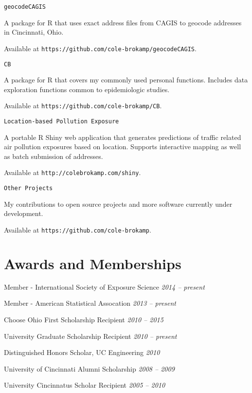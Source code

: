 \documentclass[margin,line]{res}
\newenvironment{list1}{
  \begin{list}{\ding{113}}{%
      \setlength{\itemsep}{0in}
      \setlength{\parsep}{0in} \setlength{\parskip}{0in}
      \setlength{\topsep}{0in} \setlength{\partopsep}{0in} 
      \setlength{\leftmargin}{0.17in}}}{\end{list}}
\newenvironment{list3}{
  \begin{list}{}{%
      \setlength{\itemsep}{0in}
      \setlength{\parsep}{0in} \setlength{\parskip}{0in}
      \setlength{\topsep}{0in} \setlength{\partopsep}{0in} 
      \setlength{\leftmargin}{0in}}}{\end{list}}
\begin{document}
\begin{resume}
\texttt{geocodeCAGIS}
\begin{list1} \itemsep 2pt
\item[] A package for R that uses exact address files from CAGIS to geocode addresses in Cincinnati, Ohio.
\item[] Available at \texttt{https://github.com/cole-brokamp/geocodeCAGIS}.
\end{list1}

\texttt{CB}
\begin{list1} \itemsep 2pt
\item[] A package for R that covers my commonly used personal functions. Includes data exploration functions common to epidemiologic studies. 
\item[] Available at \texttt{https://github.com/cole-brokamp/CB}.
\end{list1}

\texttt{Location-based Pollution Exposure}
\begin{list1} \itemsep 2pt
\item[] A portable R Shiny web application that generates predictions of traffic related air pollution exposures based on location.  Supports interactive mapping as well as batch submission of addresses.
\item[] Available at \texttt{http://colebrokamp.com/shiny}.
\end{list1}

\texttt{Other Projects}
\begin{list1} \itemsep 2pt
\item[] My contributions to open source projects and more software currently under development.
\item[] Available at \texttt{https://github.com/cole-brokamp}.
\end{list1}

 

\section{\sc Awards and Memberships} 

\begin{list3} \itemsep 4pt    
\item[] Member - International Society of Exposure Science \hfill \textit{2014 -- present}
\item[] Member - American Statistical Assocation \hfill \textit{2013 -- present}
\item[] Choose Ohio First Scholarship Recipient \hfill \textit{2010 -- 2015}
\item[] University Graduate Scholarship Recipient \hfill \textit{2010 -- present}
\item[] Distinguished Honors Scholar, UC Engineering \hfill \textit{2010}
\item[] University of Cincinnati Alumni Scholarship \hfill \textit{2008 -- 2009}
\item[] University Cincinnatus Scholar Recipient \hfill \textit{2005 -- 2010}
\end{list3}



\end{resume}
\end{document}
